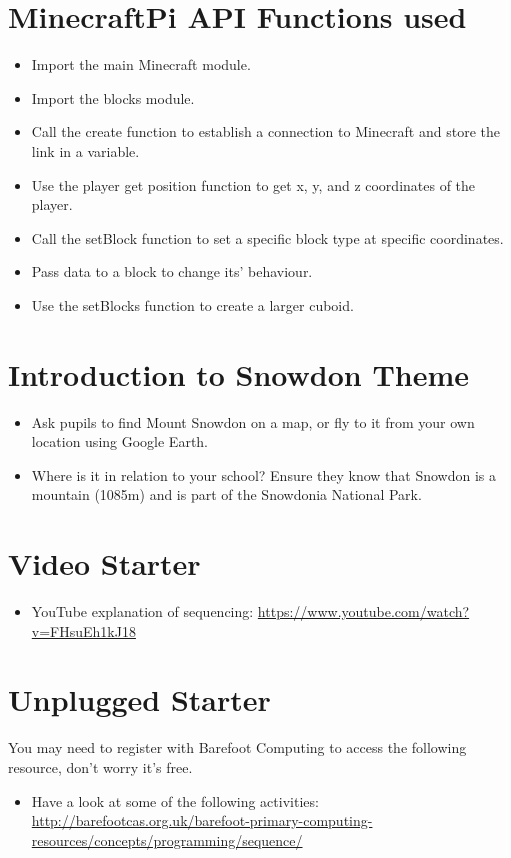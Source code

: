 \documentclass{geocraft-lesson-plan}
\begin{document}
\section*{MinecraftPi API Functions used}
\begin{itemize}
\item Import the main Minecraft module.
\item Import the blocks module.
\item Call the create function to establish a connection to Minecraft and store the link in a variable.
\item Use the player get position function to get x, y, and z coordinates of the player.
\item Call the setBlock function to set a specific block type at specific coordinates.
\item Pass data to a block to change its' behaviour.
\item Use the setBlocks function to create a larger cuboid.
\end{itemize}

\section*{Introduction to Snowdon Theme}
\begin{itemize}
\item Ask pupils to find Mount Snowdon on a map, or fly to it from your own location using Google Earth. 
\item  Where is it in relation to your school? Ensure they know that Snowdon is a mountain (1085m) and is part of the
  Snowdonia National Park.  
\end{itemize}

\section*{Video Starter}
\begin{itemize}
\item YouTube explanation of sequencing: 
  {\textcolor{greenish}
    {\url{https://www.youtube.com/watch?v=FHsuEh1kJ18}}}
\end{itemize}

\section*{Unplugged Starter}
You may need to register with Barefoot Computing to access the following resource, don't worry it's free.
\begin{itemize}
\item Have a look at some of the following activities:
  {\textcolor{greenish}
    {\url{http://barefootcas.org.uk/barefoot-primary-computing-resources/concepts/programming/sequence/}}}
\end{itemize}
\end{document}
